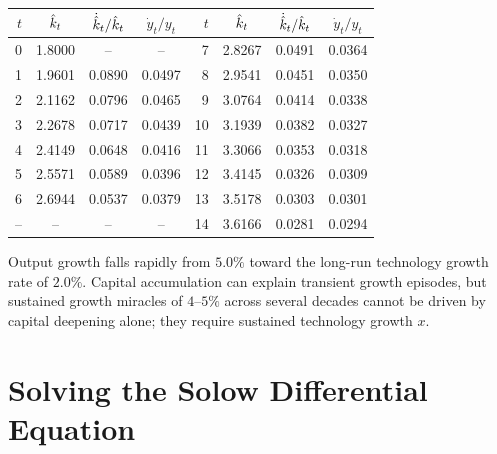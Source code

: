 \documentclass[11pt]{article}
\begin{document}
\begin{center}
\small
\begin{tabular}{@{}rccc@{\qquad}rccc@{}}
\toprule
$t$ & $\hat{k}_t$ & $\dot{\hat{k}}_t/\hat{k}_t$ & $\dot{y}_t/y_t$ & $t$ & $\hat{k}_t$ & $\dot{\hat{k}}_t/\hat{k}_t$ & $\dot{y}_t/y_t$ \\
\midrule
0 & 1.8000 & -- & -- & 7 & 2.8267 & 0.0491 & 0.0364 \\
1 & 1.9601 & 0.0890 & 0.0497 & 8 & 2.9541 & 0.0451 & 0.0350 \\
2 & 2.1162 & 0.0796 & 0.0465 & 9 & 3.0764 & 0.0414 & 0.0338 \\
3 & 2.2678 & 0.0717 & 0.0439 & 10 & 3.1939 & 0.0382 & 0.0327 \\
4 & 2.4149 & 0.0648 & 0.0416 & 11 & 3.3066 & 0.0353 & 0.0318 \\
5 & 2.5571 & 0.0589 & 0.0396 & 12 & 3.4145 & 0.0326 & 0.0309 \\
6 & 2.6944 & 0.0537 & 0.0379 & 13 & 3.5178 & 0.0303 & 0.0301 \\
-- & -- & -- & -- & 14 & 3.6166 & 0.0281 & 0.0294 \\
\bottomrule
\end{tabular}
\end{center}

 Output growth falls rapidly from $5.0\%$ toward the long-run technology growth rate of $2.0\%$. Capital accumulation can explain transient growth episodes, but sustained growth miracles of $4\text{--}5\%$ across several decades cannot be driven by capital deepening alone; they require sustained technology growth $x$.

\section{Solving the Solow Differential Equation}
\end{document}
